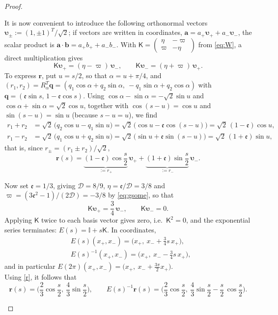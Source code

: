 \documentclass[10pt,a4paper]{amsart}
\newcommand{\D}{\mathcal{D}}
\newcommand{\ee}{\mathfrak{e}}
\begin{document}
\begin{proof}
\begin{enumerate}
\begin{itemize}
It is now convenient to introduce the following orthonormal vectors $\boldsymbol{\upsilon}_\pm:=(1,\pm1)^T/\sqrt2$; if vectors are written in coordinates, $\mathbf a=a_+\boldsymbol{\upsilon}_++a_-\boldsymbol{\upsilon}_-$, the scalar product is $\mathbf a\cdot\mathbf b=a_+b_++a_-b_-$. With $\mathsf K=\left(\begin{smallmatrix}\eta&-\varpi\\ \varpi&-\eta\end{smallmatrix}\right)$ from \eqref{eq:W}, a direct multiplication gives
\[
\mathsf K\boldsymbol{\upsilon}_+=(\eta-\varpi)\,\boldsymbol{\upsilon}_-,\qquad \mathsf K\boldsymbol{\upsilon}_-=(\eta+\varpi)\,\boldsymbol{\upsilon}_+ .
\]
To express $\mathbf r$, put $u=s/2$, so that $\alpha=u+\pi/4$, and $(r_1,r_2)=R_\alpha^T\mathbf q=(q_1\cos\alpha+q_2\sin\alpha,\ -q_1\sin\alpha+q_2\cos\alpha)$ with $\mathbf q=(\ee\sin s,\,1-\ee\cos s)$. Using $\cos\alpha-\sin\alpha=-\sqrt2\sin u$ and $\cos\alpha+\sin\alpha=\sqrt2\cos u$, together with $\cos(s-u)=\cos u$ and $\sin(s-u)=\sin u$ (because $s-u=u$), we find
\[
\begin{aligned}
r_1+r_2&=\sqrt2\,\big(q_2\cos u-q_1\sin u\big)=\sqrt2\,\big(\cos u-\ee\cos(s-u)\big)=\sqrt2\,(1-\ee)\cos u,\\
r_1-r_2&=\sqrt2\,\big(q_1\cos u+q_2\sin u\big)=\sqrt2\,\big(\sin u+\ee\sin(s-u)\big)=\sqrt2\,(1+\ee)\sin u,
\end{aligned}
\]
that is, since $r_\pm=(r_1\pm r_2)/\sqrt2$,
\begin{equation}
    \label{r}
\mathbf r(s)=\underbrace{(1-\ee)\cos\frac{s}{2}}_{:=r_+}\,\boldsymbol{\upsilon}_++\underbrace{(1+\ee)\sin\frac{s}{2}}_{:=r_-}\,\boldsymbol{\upsilon}_- .
\end{equation}

Now set $\ee=1/3$, giving $\D=8/9$, $\eta=\ee/\D=3/8$ and $\varpi=(3\ee^2-1)/(2\D)=-3/8$ by \eqref{eq:gsome}, so that
\[
\mathsf K\boldsymbol{\upsilon}_+=\frac{3}{4}\,\boldsymbol{\upsilon}_-,\qquad \mathsf K\boldsymbol{\upsilon}_-=0 .
\]
Applying $\mathsf K$ twice to each basis vector gives zero, i.e.\ $\mathsf K^2=0$, and the exponential series terminates: $E(s)=\mathbb I+s\mathsf K$. In coordinates,
\begin{equation}
    \begin{aligned}
        &E(s)(x_+,x_-)=\big(x_+,\ x_-+\frac{3}{4} s\,x_+\big),\\
&E(s)^{-1}(x_+,x_-)=\big(x_+,\ x_--\frac{3}{4} s\,x_+\big),
    \end{aligned}
\end{equation}
and in particular $E(2\pi)(x_+,x_-)=\big(x_+,\ x_-+\frac{3\pi}{2}x_+\big)$. \\
Using \eqref{r}, it follows that
\[
\mathbf r(s)=\Big(\frac{2}{3}\cos\frac{s}{2},\ \frac{4}{3}\sin\frac{s}{2}\Big),\qquad
E(s)^{-1}\mathbf r(s)=\Big(\frac{2}{3}\cos\frac{s}{2},\ \frac{4}{3}\sin\frac{s}{2}-\frac{s}{2}\,\cos\frac{s}{2}\Big).
\]


\end{itemize}
\end{enumerate}
\end{proof}
\end{document}
